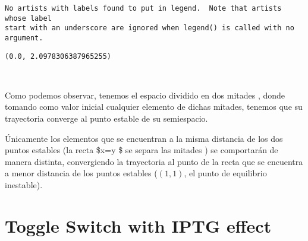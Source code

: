 \documentclass[11pt]{article}
\makeatletter
\newcommand{\boxspacing}{\kern\kvtcb@left@rule\kern\kvtcb@boxsep}
\newcommand{\prompt}[4]{
        {\ttfamily\llap{{\color{#2}[#3]:\hspace{3pt}#4}}\vspace{-\baselineskip}}
    }
\makeatother
\begin{document}
    \begin{Verbatim}[commandchars=\\\{\}]
No artists with labels found to put in legend.  Note that artists whose label
start with an underscore are ignored when legend() is called with no argument.
    \end{Verbatim}

            \begin{tcolorbox}[breakable, size=fbox, boxrule=.5pt, pad at break*=1mm, opacityfill=0]
\prompt{Out}{outcolor}{1230}{\boxspacing}
\begin{Verbatim}[commandchars=\\\{\}]
(0.0, 2.0978306387965255)
\end{Verbatim}
\end{tcolorbox}
        
    \begin{center}
    \end{center}
    { \hspace*{\fill} \\}
    
    Como podemos observar, tenemos el espacio dividido en dos mitades ,
donde tomando como valor inicial cualquier elemento de dichas mitades,
tenemos que su trayectoria converge al punto estable de su semiespacio.

Únicamente los elementos que se encuentran a la misma distancia de los
dos puntos estables (la recta \$x=y \$ se separa las mitades ) se
comportarán de manera distinta, convergiendo la trayectoria al punto de
la recta que se encuentra a menor distancia de los puntos estables
(\((1,1)\), el punto de equilibrio inestable).

    \hypertarget{toggle-switch-with-iptg-effect}{%
\section{\texorpdfstring{\textbf{Toggle Switch with IPTG
effect}}{Toggle Switch with IPTG effect}}\label{toggle-switch-with-iptg-effect}}
\end{document}
